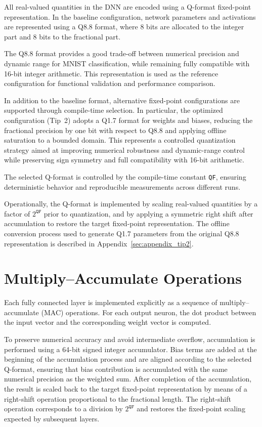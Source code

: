 All real-valued quantities in the DNN are encoded using a Q-format fixed-point
representation.
In the baseline configuration, network parameters and activations are represented
using a Q8.8 format, where 8 bits are allocated to the integer part and 8 bits to
the fractional part.

The Q8.8 format provides a good trade-off between numerical precision and dynamic
range for MNIST classification, while remaining fully compatible with 16-bit
integer arithmetic.
This representation is used as the reference configuration for functional
validation and performance comparison.

In addition to the baseline format, alternative fixed-point configurations are
supported through compile-time selection.
In particular, the optimized configuration (Tip~2) adopts a Q1.7 format for
weights and biases, reducing the fractional precision by one bit with respect to
Q8.8 and applying offline saturation to a bounded domain.
This represents a controlled quantization strategy aimed at improving numerical
robustness and dynamic-range control while preserving sign symmetry and full
compatibility with 16-bit arithmetic.

The selected Q-format is controlled by the compile-time constant \texttt{QF},
ensuring deterministic behavior and reproducible measurements across different
runs.

Operationally, the Q-format is implemented by scaling real-valued quantities by
a factor of $2^{\texttt{QF}}$ prior to quantization, and by applying a symmetric
right shift after accumulation to restore the target fixed-point representation.
The offline conversion process used to generate Q1.7 parameters from the original
Q8.8 representation is described in Appendix~\ref{sec:appendix_tip2}.



\section{Multiply--Accumulate Operations}

Each fully connected layer is implemented explicitly as a sequence of
multiply--accumulate (MAC) operations.
For each output neuron, the dot product between the input vector and the
corresponding weight vector is computed.

To preserve numerical accuracy and avoid intermediate overflow, accumulation is
performed using a 64-bit signed integer accumulator.
Bias terms are added at the beginning of the accumulation process and are aligned
according to the selected Q-format, ensuring that bias contribution is accumulated
with the same numerical precision as the weighted sum.
After completion of the accumulation, the result is scaled back to the target
fixed-point representation by means of a right-shift operation proportional to
the fractional length.
The right-shift operation corresponds to a division by $2^{\texttt{QF}}$ and
restores the fixed-point scaling expected by subsequent layers.

